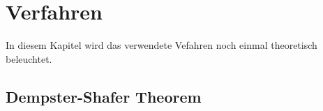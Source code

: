 \chapter{Verfahren}
In diesem Kapitel wird das verwendete Vefahren noch einmal
theoretisch beleuchtet.
\section{Dempster-Shafer Theorem}
  
